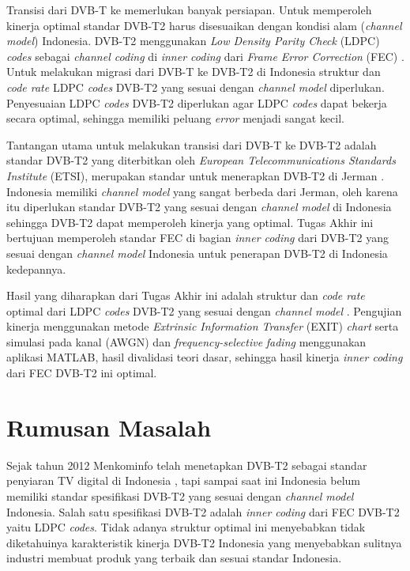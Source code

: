 Transisi dari DVB-T ke  memerlukan banyak persiapan. Untuk memperoleh kinerja optimal standar DVB-T2 harus disesuaikan dengan kondisi alam (\textit{channel model}) Indonesia. DVB-T2 menggunakan \textit{Low Density Parity Check} (LDPC) \textit{codes} sebagai \textit{channel coding} di \textit{inner coding} dari \textit{Frame Error Correction} (FEC) \cite{etsi1}. Untuk melakukan migrasi dari DVB-T ke DVB-T2 di Indonesia struktur dan \textit{code rate} LDPC \textit{codes} DVB-T2 yang sesuai dengan \textit{channel model}  diperlukan. Penyesuaian LDPC \textit{codes} DVB-T2 diperlukan agar LDPC \textit{codes} dapat bekerja secara optimal, sehingga memiliki peluang \textit{error} menjadi sangat kecil. 

Tantangan utama untuk melakukan transisi dari DVB-T ke DVB-T2 adalah standar DVB-T2 yang diterbitkan oleh \textit{European Telecommunications Standards Institute} (ETSI), merupakan standar untuk menerapkan DVB-T2 di Jerman \cite{etsi2}. Indonesia memiliki \textit{channel model} yang sangat berbeda dari Jerman, oleh karena itu diperlukan standar DVB-T2 yang sesuai dengan \textit{channel model} di Indonesia sehingga DVB-T2 dapat memperoleh kinerja yang optimal. Tugas Akhir ini bertujuan memperoleh standar FEC di bagian \textit{inner coding} dari DVB-T2 yang sesuai dengan \textit{channel model} Indonesia untuk penerapan DVB-T2 di Indonesia kedepannya.   

Hasil yang diharapkan dari Tugas Akhir ini adalah struktur dan \textit{code rate} optimal dari LDPC \textit{codes} DVB-T2 yang sesuai dengan \textit{channel model} . Pengujian kinerja menggunakan metode \textit{Extrinsic Information Transfer} (EXIT) \textit{chart} serta simulasi pada kanal  (AWGN) dan \textit{frequency-selective} \textit{fading} menggunakan aplikasi MATLAB, hasil divalidasi  teori dasar, sehingga hasil kinerja \textit{inner coding} dari FEC DVB-T2 ini optimal. 

\section{Rumusan Masalah}
Sejak tahun 2012 Menkominfo telah menetapkan DVB-T2 sebagai standar penyiaran TV digital di Indonesia \cite{regul}, tapi sampai saat ini Indonesia belum memiliki standar spesifikasi DVB-T2 yang sesuai dengan \textit{channel model} Indonesia. Salah satu spesifikasi DVB-T2 adalah \textit{inner coding} dari FEC DVB-T2 yaitu LDPC \textit{codes}. Tidak adanya struktur optimal ini menyebabkan tidak diketahuinya karakteristik kinerja DVB-T2 Indonesia yang menyebabkan sulitnya industri membuat produk yang terbaik dan sesuai standar Indonesia.

